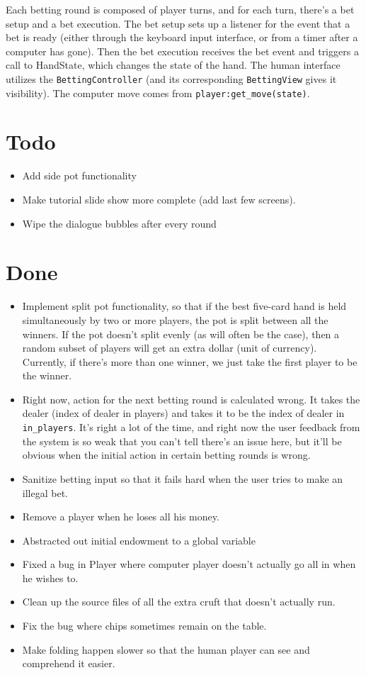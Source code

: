 \documentclass[10pt]{article}
\begin{document}
Each betting round is composed of player turns, and for each turn,
there's a bet setup and a bet execution. The bet setup sets up a
listener for the event that a bet is ready (either through the
keyboard input interface, or from a timer after a computer has
gone). Then the bet execution receives the bet event and triggers a
call to HandState, which changes the state of the hand. The human
interface utilizes the \verb^BettingController^ (and its corresponding
\verb^BettingView^ gives it visibility). The computer move comes from
\verb^player:get_move(state)^.

\section*{Todo}
\begin{itemize}
\item Add side pot functionality
\item Make tutorial slide show more complete (add last few screens).
\item Wipe the dialogue bubbles after every round
\end{itemize}

\section*{Done}
\begin{itemize}
\item \CheckedBox Implement split pot functionality, so that if the
  best five-card hand is held simultaneously by two or more players,
  the pot is split between all the winners. If the pot doesn't split
  evenly (as will often be the case), then a random subset of players
  will get an extra dollar (unit of currency). Currently, if there's
  more than one winner, we just take the first player to be the
  winner.
\item \CheckedBox Right now, action for the next betting round is
  calculated wrong. It takes the dealer (index of dealer in players)
  and takes it to be the index of dealer in \verb^in_players^. It's
  right a lot of the time, and right now the user feedback from the
  system is so weak that you can't tell there's an issue here, but
  it'll be obvious when the initial action in certain betting rounds
  is wrong.
\item \CheckedBox Sanitize betting input so that it fails hard when
  the user tries to make an illegal bet.
\item \CheckedBox Remove a player when he loses all his money.
\item \CheckedBox Abstracted out initial endowment to a global
  variable
\item \CheckedBox Fixed a bug in Player where computer player doesn't
  actually go all in when he wishes to.
\item \CheckedBox Clean up the source files of all the extra cruft
  that doesn't actually run.
\item \CheckedBox Fix the bug where chips sometimes remain on the table.
\item \CheckedBox Make folding happen slower so that the human player
  can see and comprehend it easier.
\end{itemize}
\end{document}
